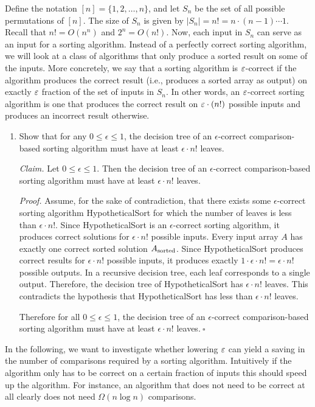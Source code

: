 Define the notation $[n] = \{1, 2, \ldots, n\}$, and let $S_n$ be the set of all possible permutations of $[n]$. The size of $S_n$ is given by $|S_n|=n!=n\cdot (n-1) \cdots 1$. Recall that $n!=O(n^n)$ and $2^n=O(n!)$. 
Now, each input in $S_n$ can serve as an input for a sorting algorithm. Instead of a perfectly correct sorting algorithm, we will look at a class of algorithms that only produce a sorted result on some of the inputs. More concretely, we say that a sorting algorithm is $\varepsilon$-correct if the algorithm produces the correct result (i.e., produces a sorted array as output) on exactly $\varepsilon$ fraction of the set of inputs in $S_n$. In other words, an $\varepsilon$-correct sorting algorithm is one that produces the correct result on $\varepsilon \cdot (n!)$ possible inputs and produces an incorrect result otherwise.
\begin{enumerate}
    \item Show that for any $0\leq \epsilon\leq 1$, the decision tree of an $\epsilon$-correct comparison-based sorting algorithm must have at least $\epsilon \cdot n!$ leaves.
\begin{solution}
\textit{Claim. }Let $0\leq\epsilon\leq 1$. Then the decision tree of an $\epsilon$-correct comparison-based sorting algorithm must have at least $\epsilon\cdot n!$ leaves.

\textit{Proof. }Assume, for the sake of contradiction, that there exists some $\epsilon$-correct sorting algorithm {\sc HypotheticalSort} for which the number of leaves is less than $\epsilon\cdot n!$. Since {\sc HypotheticalSort} is an $\epsilon$-correct sorting algorithm, it produces correct solutions for $\epsilon\cdot n!$ possible inputs. Every input array $A$ has exactly one correct sorted solution $A_{\rm sorted}$. Since {\sc HypotheticalSort} produces correct results for $\epsilon\cdot n!$ possible inputs, it produces exactly $1\cdot\epsilon\cdot n!=\epsilon\cdot n!$ possible outputs. In a recursive decision tree, each leaf corresponds to a single output. Therefore, the decision tree of {\sc HypotheticalSort} has $\epsilon\cdot n!$ leaves. This contradicts the hypothesis that {\sc HypotheticalSort} has less than $\epsilon\cdot n!$ leaves.

Therefore for all $0\leq\epsilon\leq 1$, the decision tree of an $\epsilon$-correct comparison-based sorting algorithm must have at least $\epsilon\cdot n!$ leaves.$~\square$
\end{solution}
\end{enumerate}

\noindent
In the following, we want to investigate whether lowering $\varepsilon$ can yield a saving in the number of comparisons required by a sorting algorithm. Intuitively if the algorithm only has to be correct on a certain fraction of inputs this should speed up the algorithm. For instance, an algorithm that does not need to be correct at all clearly does not need $\Omega(n \log n)$ comparisons.  

